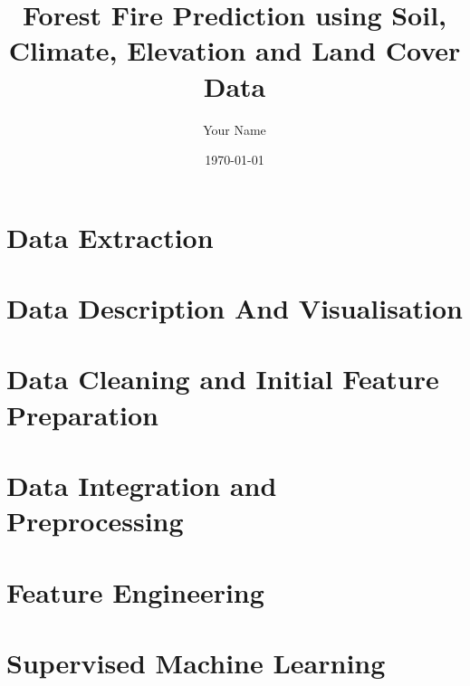 \documentclass[11pt,a4paper]{report}
\title{Forest Fire Prediction using Soil, Climate, Elevation and Land Cover Data}
\author{Your Name}
\date{\today}
\begin{document}

\pagestyle{empty}


\clearpage
{}
\pagestyle{plain}
\tableofcontents

\clearpage
{}
\setcounter{page}{1}
\pagestyle{fancy}


\chapter{Data Extraction}


\chapter{Data Description And Visualisation}


\chapter{Data Cleaning and Initial Feature Preparation}

\chapter{Data Integration and Preprocessing}


\chapter{Feature Engineering}


\chapter{Supervised Machine Learning}

\end{document}
